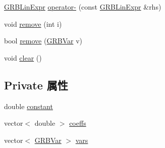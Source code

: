 \begin{DoxyCompactItemize}
\item 
\hyperlink{classGRBLinExpr}{G\+R\+B\+Lin\+Expr} \hyperlink{classGRBLinExpr_a2bd54ff49c976ffe9dc7764d6f732d90}{operator-\/} (const \hyperlink{classGRBLinExpr}{G\+R\+B\+Lin\+Expr} \&rhs)
\item 
void \hyperlink{classGRBLinExpr_a112f03db7d72c70e1d35ff0a5d0197e3}{remove} (int i)
\item 
bool \hyperlink{classGRBLinExpr_ac5d17e62d9f3a918270d6dfe81d157f1}{remove} (\hyperlink{classGRBVar}{G\+R\+B\+Var} v)
\item 
void \hyperlink{classGRBLinExpr_aae564561808839e6b72327a3dda1417b}{clear} ()
\end{DoxyCompactItemize}
\subsection*{Private 属性}
\begin{DoxyCompactItemize}
\item 
double \hyperlink{classGRBLinExpr_a3cbf5b4a570659fab686d349584d5614}{constant}
\item 
vector$<$ double $>$ \hyperlink{classGRBLinExpr_ae1b3b0796efe5b47e4607b56ce87ca1c}{coeffs}
\item 
vector$<$ \hyperlink{classGRBVar}{G\+R\+B\+Var} $>$ \hyperlink{classGRBLinExpr_a0cfef12c4fdb11e4c623007b03a61993}{vars}
\end{DoxyCompactItemize}
